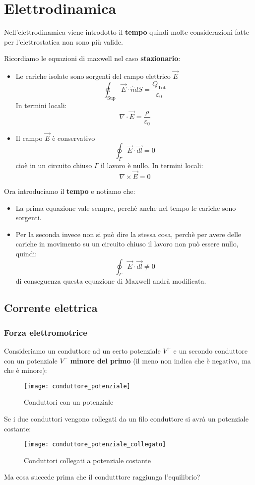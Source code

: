 \documentclass[a4paper]{article}
\begin{document}
\section{Elettrodinamica}
Nell'elettrodinamica viene introdotto il \textbf{tempo} quindi molte considerazioni
fatte per l'elettrostatica non sono più valide.

Ricordiamo le equazioni di maxwell nel caso \textbf{stazionario}:
\begin{itemize}
  \item 
    Le cariche isolate sono sorgenti del campo elettrico \( \vec{E} \) 
    \[
      \oint_{\text{Sup}} \vec{E} \cdot \hat{n} dS = \frac{Q_{\text{Tot}}}{\varepsilon_0}
    \] 
    In termini locali:
    \[
      \nabla \cdot \vec{E} = \frac{\rho}{\varepsilon_0}
    \] 

  \item Il campo \( \vec{E} \) è conservativo
    \[
      \oint_{\Gamma} \vec{E} \cdot \vec{dl} = 0
    \] 
    cioè in un circuito chiuso \( \Gamma \) il lavoro è nullo.
    In termini locali:
    \[
      \nabla \times \vec{E} = 0
    \] 
\end{itemize}
Ora introduciamo il \textbf{tempo} e notiamo che:
\begin{itemize}
  \item La prima equazione vale sempre, perchè anche nel tempo le cariche sono sorgenti.

  \item Per la seconda invece non si può dire la stessa cosa, perchè per avere delle 
    cariche in movimento su un circuito chiuso il lavoro non può essere nullo, quindi:
    \[
      \oint_{\Gamma } \vec{E} \cdot \vec{dl} \neq 0
    \] 
    di conseguenza questa equazione di Maxwell andrà modificata.
\end{itemize}

\subsection{Corrente elettrica}
\subsubsection{Forza elettromotrice}
Consideriamo un conduttore ad un certo potenziale \( V^+ \)  e un secondo conduttore con
un potenziale \( V^- \)  \textbf{minore del primo} (il meno non indica che è negativo,
ma che è minore):
\begin{figure}[H]
  \centering
  \texttt{[image: conduttore\_potenziale]}
  \caption{Conduttori con un potenziale}
\end{figure}
\noindent
Se i due conduttori vengono collegati da un filo conduttore si avrà un potenziale costante:
\begin{figure}[H]
  \centering
  \texttt{[image: conduttore\_potenziale\_collegato]}
  \caption{Conduttori collegati a potenziale costante}
\end{figure}
\noindent
Ma cosa succede prima che il condutttore raggiunga l'equilibrio?
\end{document}
